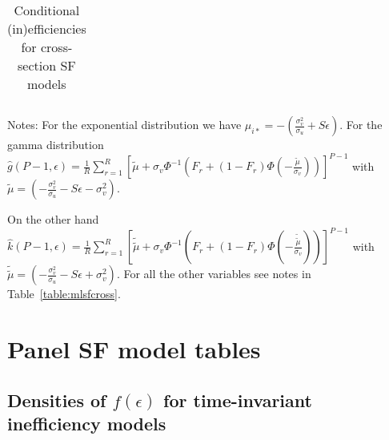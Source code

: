 \documentclass[nojss]{jss}
\begin{document}
\begin{appendix}
\begin{table}[h]
\begin{threeparttable}
\begin{adjustbox}{max width=1\textwidth}
\begin{tabular}{@{}cccc@{}}
\bottomrule
\end{tabular}
\end{adjustbox}
\begin{tablenotes}
      \tiny
      \item Notes: For the exponential distribution we have $\mu_{i*} = -\left(\frac{\sigma_v^2}{\sigma_u} + S\epsilon\right)$. For the gamma distribution $\hat{g}(P-1, \epsilon)= \frac{1}{R}\sum_{r = 1}^R \left[\tilde{\mu} + 
\sigma_v\Phi^{-1}\left(F_{r}+ \left(1-F_{r}\right)\Phi\left(-\frac{\tilde{\mu}}{
\sigma_v}\right)\right)\right]^{P-1}$ with $\tilde{\mu} = \left(-\frac{\sigma_v^2}{\sigma_u} - S\epsilon - \sigma_v^2\right)$. 
      \item On the other hand $\hat{k}(P-1, \epsilon)= \frac{1}{R}\sum_{r = 1}^R \left[\tilde{\tilde{\mu}} + 
\sigma_v\Phi^{-1}\left(F_{r}+ \left(1-F_{r}\right)\Phi\left(-\frac{\tilde{\tilde{\mu}}}{
\sigma_v}\right)\right)\right]^{P-1}$ with $\tilde{\tilde{\mu}} = \left(-\frac{\sigma_v^2}{\sigma_u} - S\epsilon + \sigma_v^2\right)$. 
For all the other variables see notes in Table~\ref{table:mlsfcross}.
    \end{tablenotes}
\caption{Conditional (in)efficiencies for cross-section SF models}
\label{table:effcross}
\end{threeparttable}
\end{table}

\newpage

\section{Panel SF model tables} \label{app:sfpanel}

\setcounter{table}{0}
\subsection{Densities of $f(\epsilon)$ for time-invariant inefficiency models}




\end{appendix}
\end{document}
